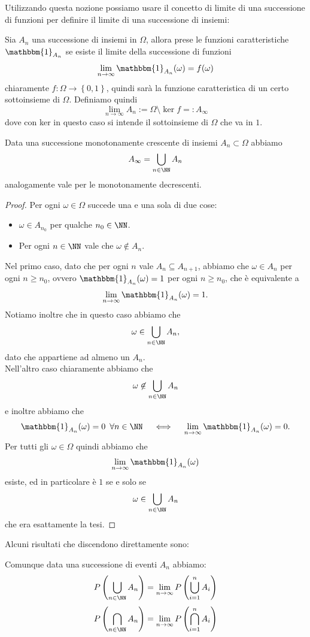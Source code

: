 \documentclass[11pt]{scrartcl}
\begin{document}
	Utilizzando questa nozione possiamo usare il concetto di limite di una successione di funzioni per definire il limite di una successione di insiemi:
	\begin{definition}
		Sia $A_n$ una successione di insiemi in $\Omega$, allora prese le funzioni caratteristiche $\mathbbm{1}_{A_n}$ se esiste il limite della successione di funzioni
		$$\lim_{n\to\infty}\mathbbm{1}_{A_n}(\omega)=f(\omega)$$
		chiaramente $f:\Omega\to \left\{0,1\right\}$, quindi sarà la funzione caratteristica di un certo sottoinsieme di $\Omega$. Definiamo quindi
		$$\lim_{n\to\infty}A_n:=\Omega\setminus\ker{f}=:A_\infty$$
		dove con ker in questo caso si intende il sottoinsieme di $\Omega$ che va in $1$.
	\end{definition}
	\begin{lemma}
		Data una successione monotonamente crescente di insiemi $A_n\subset \Omega$ abbiamo
		$$A_\infty=\bigcup_{n\in\NN}A_n$$
		analogamente vale per le monotonamente decrescenti.
	\end{lemma}
	\begin{proof}
		Per ogni $\omega\in \Omega$ succede una e una sola di due cose:
		\begin{itemize}
			\item $\omega\in A_{n_0}$ per qualche $n_0\in\NN$. 
			\item Per ogni $n\in\NN$ vale che $\omega\not\in A_n$.
		\end{itemize}
		Nel primo caso, dato che per ogni $n$ vale $A_n\subseteq A_{n+1}$, abbiamo che $\omega\in A_n$ per ogni $n\ge n_0$, ovvero $\mathbbm{1}_{A_n}(\omega)=1$ per ogni $n\ge n_0$, che è equivalente a
		$$\lim_{n\to \infty}\mathbbm{1}_{A_n}(\omega)=1.$$ 
		Notiamo inoltre che in questo caso abbiamo che 
		$$\omega\in \bigcup_{n\in\NN}A_n,$$
		dato che appartiene ad almeno un $A_n$. \\
		Nell'altro caso chiaramente abbiamo che 
		$$\omega\not \in\bigcup_{n\in\NN}A_n$$
		e inoltre abbiamo che 
		$$\mathbbm{1}_{A_n}(\omega)=0 \,\,\, \forall n\in\NN \quad \iff \quad \lim_{n\to\infty}\mathbbm{1}_{A_n}(\omega)=0. $$
		Per tutti gli $\omega\in\Omega$ quindi abbiamo che 
		$$\lim_{n\to\infty}\mathbbm{1}_{A_n}(\omega)$$
		esiste, ed in particolare è $1$ se e solo se 
		$$\omega\in \bigcup_{n\in \NN}A_n$$
		che era esattamente la tesi.
	\end{proof}
	Alcuni risultati che discendono direttamente sono:
	\begin{corollary}
		Comunque data una successione di eventi $A_n$ abbiamo:
		$$P\left(\bigcup_{n\in \NN} A_n\right)=\lim_{n\to\infty}P\left(\bigcup_{i=1}^nA_i\right)$$
		$$P\left(\bigcap_{n\in \NN} A_n\right)=\lim_{n\to\infty}P\left(\bigcap_{i=1}^nA_i\right)$$
	\end{corollary}
\end{document}
